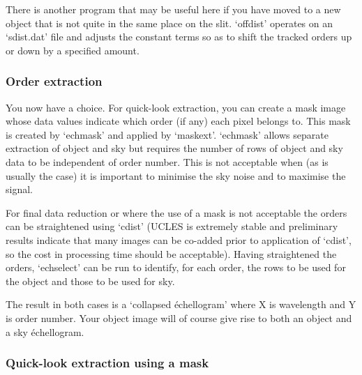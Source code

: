    There is another program that may be useful here if you have moved
   to a new object that is not quite in the same place on the slit.
   `offdist' operates on an `sdist.dat' file and adjusts the constant
   terms so as to shift the tracked orders up or down by a specified
   amount.


\subsubsection{\label{techno13extract}Order extraction}

\begin{latexonly}
\begin{figure}[htb]
\begin{center}
\leavevmode{}
\end{center}
\end{figure}
\end{latexonly}

   You now have a choice. For quick-look extraction, you can create a
   mask image whose data values indicate which order (if any) each pixel
   belongs to. This mask is created by `echmask' and applied by
   `maskext'. `echmask' allows separate extraction of object and sky but
   requires the number of rows of object and sky data to be independent
   of order number. This is not acceptable when (as is usually the case)
   it is important to minimise the sky noise and to maximise the signal.

   For final data reduction or where the use of a mask is not acceptable
   the orders can be straightened using `cdist' (UCLES is extremely
   stable and preliminary results indicate that many images can be
   co-added prior to application of `cdist', so the cost in processing
   time should be acceptable). Having straightened the orders,
   `echselect' can be run to identify, for each order, the rows to be
   used for the object and those to be used for sky.

   The result in both cases is a `collapsed \'echellogram' where X is
   wavelength and Y is order number. Your object image will of course
   give rise to both an object and a sky \'echellogram.


\subsubsection{Quick-look extraction using a mask}

